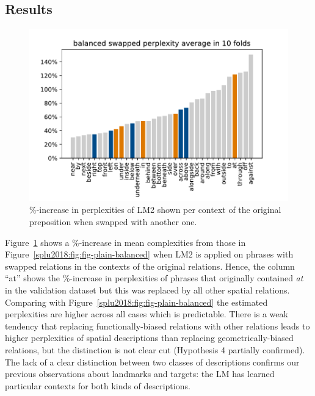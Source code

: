 \subsection{Results}











\begin{figure}[htbp]
  \begin{center}
  \includegraphics[width=0.6\linewidth]{studies/splu2018/figures/b_swapped_cv-avg.pdf}
  \caption{\%-increase in perplexities of LM2 shown per context of the original preposition when swapped with another one.}
  \label{splu2018:fig:fig-swap-balanced}
\end{center}
\end{figure}


Figure~\ref{splu2018:fig:fig-swap-balanced} shows a \%-increase in mean
complexities from those in Figure~\ref{splu2018:fig:fig-plain-balanced} when
LM2 is applied on phrases with swapped relations in the contexts of
the original relations. Hence, the column ``at'' shows the \%-increase
in perplexities of phrases that originally contained \emph{at} in the
validation dataset but this was replaced by all other spatial
relations. Comparing with Figure~\ref{splu2018:fig:fig-plain-balanced} the
estimated perplexities are higher across all cases which is
predictable. There is a weak tendency that replacing
functionally-biased relations with other relations leads to higher
perplexities of spatial descriptions than replacing
geometrically-biased relations, but the distinction is not
clear cut (Hypothesis 4 partially confirmed). The lack of a clear
distinction between two classes of descriptions confirms our previous
observations about landmarks and targets: the LM has learned
particular contexts for both kinds of descriptions.


















